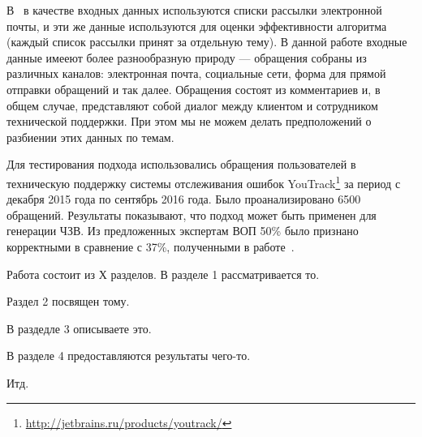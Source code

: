 В~\cite{original} в качестве входных данных используются списки рассылки электронной почты, и эти же данные используются для оценки эффективности алгоритма (каждый список рассылки принят за отдельную тему). В данной работе входные данные имееют более разнообразную природу --- обращения собраны из различных каналов: электронная почта, социальные сети, форма для прямой отправки обращений и так далее. Обращения состоят из комментариев и, в общем случае, представляют собой диалог между клиентом и сотрудником технической поддержки. При этом мы не можем делать предположений о разбиении этих данных по темам.

Для тестирования подхода использовались обращения пользователей в техническую поддержку системы отслеживания ошибок YouTrack\footnote{\url{http://jetbrains.ru/products/youtrack/}} за период с декабря 2015 года по сентябрь 2016 года. Было проанализировано 6500 обращений. Результаты показывают, что подход может быть применен для генерации ЧЗВ. Из предложенных экспертам ВОП 50\% было признано корректными в сравнение с 37\%, полученными в работе~\cite{original}.

Работа состоит из Х разделов. В разделе 1 рассматривается то.

Раздел 2 посвящен тому.

В раздедле 3 описываете это.

В разделе 4 предоставляются результаты чего-то.

Итд.